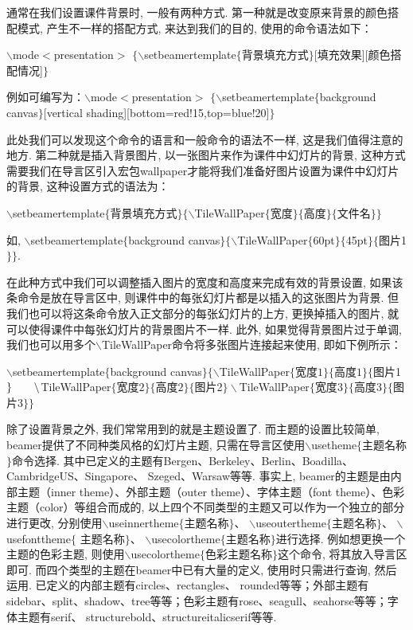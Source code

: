 通常在我们设置课件背景时, 一般有两种方式. 第一种就是改变原来背景的颜色搭配模式, 产生不一样的搭配方式, 来达到我们的目的, 使用的命令语法如下：
\centerline{
$\backslash$mode$<$presentation$>$
$\{\backslash$setbeamertemplate$\{$背景填充方式$\}$[填充效果][颜色搭配情况]$\}$}
例如可编写为：$\backslash$mode$<$presentation$>$
$\{\backslash$setbeamertemplate$\{$background canvas$\}$[vertical shad\-ing][bottom=red!15,top=blue!20]$\}$


此处我们可以发现这个命令的语言和一般命令的语法不一样, 这是我们值得注意的地方.
第二种就是插入背景图片, 以一张图片来作为课件中幻灯片的背景, 这种方式需要我们在导言区引入宏包wallpaper才能将我们准备好图片设置为课件中幻灯片的背景, 这种设置方式的语法为：\\
\centerline{
$\backslash$setbeamertemplate$\{$背景填充方式$\}\{\backslash$TileWallPaper$\{$宽度$\}\{$高度$\}\{$文件名$\}\}$}
如, $\backslash$setbeamertemplate$\{$background canvas$\}\{\backslash$TileWallPaper$\{$60pt$\}\{$45pt$\}\{$图片1$\}\}$.


在此种方式中我们可以调整插入图片的宽度和高度来完成有效的背景设置, 如果该条命令是放在导言区中, 则课件中的每张幻灯片都是以插入的这张图片为背景. 但我们也可以将这条命令放入正文部分的每张幻灯片的上方, 更换掉插入的图片, 就可以使得课件中每张幻灯片的背景图片不一样. 此外, 如果觉得背景图片过于单调, 我们也可以用多个$\backslash$TileWallPaper命令将多张图片连接起来使用, 即如下例所示：

\noindent$\backslash$setbeamertemplate$\{$background canvas$\}\{\backslash$TileWallPaper$\{$宽度$1\}\{$高度$1\}\{$图片1$\}\\ \qquad \backslash$TileWallPaper$\{$宽度$2\}\{$高度$2\}\{$图片2$\} \backslash$TileWallPaper$\{$宽度$3\}\{$高度$3\}\{$图片3$\}\}$


除了设置背景之外, 我们常常用到的就是主题设置了. 而主题的设置比较简单, beamer提供了不同种类风格的幻灯片主题, 只需在导言区使用$\backslash$usetheme$\{$主题名称$\}$命令选择. 其中已定义的主题有Bergen、Berkeley、Berlin、Boadilla、CambridgeUS、Singapore、
Szeged、Warsaw等等. 事实上, beamer的主题是由内部主题（inner theme）、外部主题（outer theme）、字体主题（font theme）、色彩主题（color）等组合而成的, 以上四个不同类型的主题又可以作为一个独立的部分进行更改, 分别使用$\backslash$useinnertheme$\{$主题名称$\}$、 $\backslash$useoutertheme$\{$主题名称$\}$、 $\backslash$usefonttheme$\{$ 主题名称$\}$、 $\backslash$usecolortheme$\{$主题名称$\}$进行选择. 例如想更换一个主题的色彩主题, 则使用$\backslash$usecolortheme$\{$色彩主题名称$\}$这个命令, 将其放入导言区即可. 而四个类型的主题在beamer中已有大量的定义, 使用时只需进行查询, 然后运用. 已定义的内部主题有circles、rectangles、
rounded等等；外部主题有sidebar、split、shadow、tree等等；色彩主题有rose、seagull、seahorse等等；字体主题有serif、
structurebold、structureitalicserif等等.


